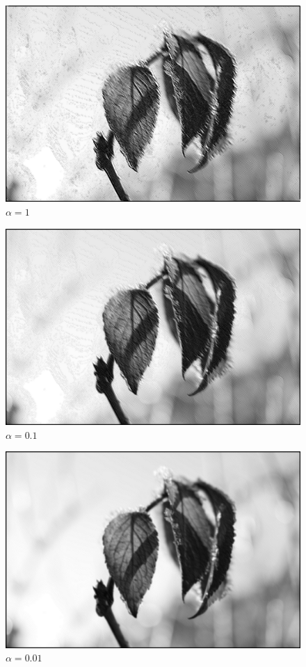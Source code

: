 \documentclass{article}
\theoremstyle{case}
\begin{document}
\begin{figure}
  \includegraphics[width=\linewidth]{../output/neu2_output_18k_alpha1.png}
  \caption{$\alpha=1$}
  \label{fig:bilda1}
\end{figure}

\begin{figure}
  \includegraphics[width=\linewidth]{../output/neu2_output_18k_alpha01.png}
  \caption{$\alpha=0.1$}
  \label{fig:bilda2}
\end{figure}

\begin{figure}
  \includegraphics[width=\linewidth]{../output/neu2_output_18k_alpha001.png}
  \caption{$\alpha=0.01$}
  \label{fig:bilda3}
\end{figure}
\end{document}
